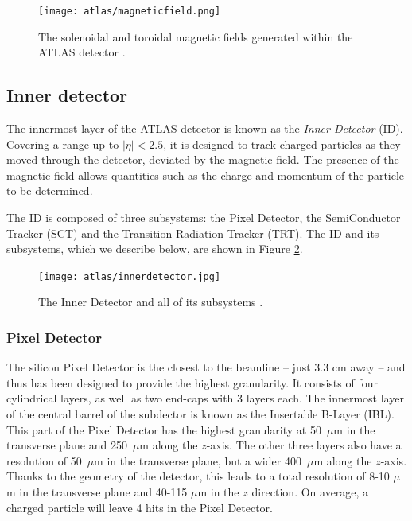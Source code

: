 \documentclass[10pt,a4paper]{book}
\begin{document}
\begin{figure}
    \centering
    \texttt{[image: atlas/magneticfield.png]}
    \caption{The solenoidal and toroidal magnetic fields generated within the ATLAS detector \cite{RodriguezVera:2770604}.}
    \label{magnet}
\end{figure}

\subsection{Inner detector}

The innermost layer of the ATLAS detector is known as the \emph{Inner Detector} (ID). Covering a range up to $\vert \eta \vert < 2.5$, it is designed to track charged particles as they moved through the detector, deviated by the magnetic field. The presence of the magnetic field allows quantities such as the charge and momentum of the particle to be determined.  

The ID is composed of three subsystems:  the Pixel Detector, the SemiConductor Tracker (SCT) and the Transition Radiation Tracker (TRT). The ID and its subsystems, which we describe below, are shown in Figure \ref{id}.

\begin{figure}
    \centering
    \texttt{[image: atlas/innerdetector.jpg]}
    \caption{The Inner Detector and all of its subsystems \cite{Pequenao:1095926}.}
    \label{id}
\end{figure}

\subsubsection{Pixel Detector}
The silicon Pixel Detector is the closest to the beamline -- just 3.3 cm away -- and thus has been designed to provide the highest granularity. It consists of four cylindrical layers, as well as two end-caps with 3 layers each. 
The innermost layer of the central barrel of the subdector is known as the Insertable B-Layer (IBL). This part of the Pixel Detector has the highest granularity at 50~$\mu$m in the transverse plane and 250~$\mu$m along the $z$-axis. The other three layers also have a resolution of 50~$\mu$m in the transverse plane, but a wider 400~$\mu$m along the $z$-axis. Thanks to the geometry of the detector, this leads to a total resolution of 8-10 $\mu$m in the transverse plane and 40-115 $\mu$m in the $z$ direction. On average, a charged particle will leave 4 hits in the Pixel Detector. 
\end{document}
